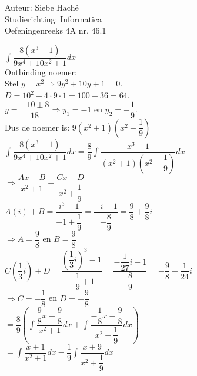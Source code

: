 \documentclass[a4paper]{article}
\begin{document}
\noindent \large Auteur: Siebe Haché \\
\noindent \large Studierichting: Informatica\\
\noindent \large Oefeningenreeks 4A nr. 46.1\\

\medskip

\normalsize

$ \displaystyle\int\dfrac{8(x^3 - 1)}{9x^4+10x^2+1}dx$\\

Ontbinding noemer:\\

Stel $y = x^2 \Rightarrow 9y^2 + 10y + 1 = 0$. \\

$D = 10^2 - 4 \cdot 9 \cdot 1 = 100 - 36 = 64$. \\

$y = \dfrac{-10 \pm 8}{18} \Rightarrow y_1 = -1$ en $y_2 = -\dfrac{1}{9}$. \\

Dus de noemer is: $9(x^2+1) \left(x^2+\dfrac{1}{9}\right)$\\

$ \displaystyle\int\dfrac{8(x^3 - 1)}{9x^4+10x^2+1}dx = \dfrac{8}{9}\displaystyle\int\dfrac{x^3-1}{\left(x^2+1\right)\left(x^2+\dfrac{1}{9}\right)}dx $\\

$ \Rightarrow \dfrac{Ax + B}{x^2+1} + \dfrac{Cx + D}{x^2 + \dfrac{1}{9}} $\\

$ A\left(i\right) + B = \dfrac{i^3 - 1}{-1 + \dfrac{1}{9}} = \dfrac{-i - 1}{-\dfrac{8}{9}} = \dfrac{9}{8} + \dfrac{9}{8}i $\\

$ \Rightarrow A = \dfrac{9}{8}$ en $B = \dfrac{9}{8} $\\

$ C\left(\dfrac{1}{3}i\right) + D = \dfrac{\left(\dfrac{1}{3}i\right)^3 - 1}{-\dfrac{1}{9}+1} = \dfrac{-\dfrac{1}{27}i - 1}{\dfrac{8}{9}} = -\dfrac{9}{8} - \dfrac{1}{24}i $\\

$ \Rightarrow C = -\dfrac{1}{8}$ en $D = -\dfrac{9}{8} $\\

$ = \dfrac{8}{9} \left( \displaystyle\int\dfrac{\dfrac{9}{8}x + \dfrac{9}{8}}{x^2+1}dx 
+ \displaystyle\int\dfrac{-\dfrac{1}{8}x 
- \dfrac{9}{8}}{x^2+\dfrac{1}{9}}dx \right)$\\ 

$= \displaystyle\int\dfrac{x+1}{x^2+1}dx - \dfrac{1}{9}\displaystyle\int\dfrac{x+9}{x^2+\dfrac{1}{9}}dx $\\
\end{document}
